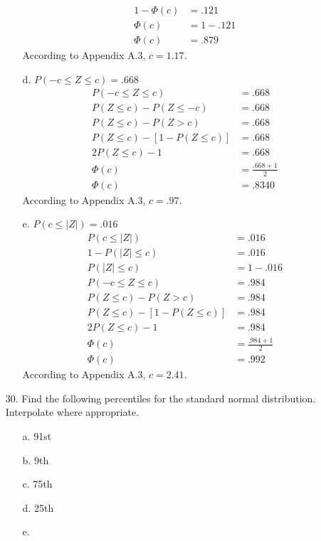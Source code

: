 \documentclass[letterpaper,12pt]{article}
\begin{document}
\begin{enumerate}
\begin{enumerate}
\begin{align*}
          1 - \Phi(c) &= .121 \\
          \Phi(c) &= 1 - .121 \\
          \Phi(c) &= .879
        \end{align*}
        According to Appendix A.3, $c = 1.17$.
      \item[d.]
        $P(-c \le Z \le c) = .668$
        \begin{align*}
          P(-c \le Z \le c) &= .668 \\
          P(Z \le c) - P(Z \le -c) &= .668 \\
          P(Z \le c) - P(Z > c) &= .668 \\
          P(Z \le c) - [1 - P(Z \le c)] &= .668 \\
          2P(Z \le c) - 1 &= .668 \\
          \Phi(c) &= \frac{.668 + 1}{2} \\
          \Phi(c) &= .8340
        \end{align*}
        According to Appendix A.3, $c = .97$.
      \item[e.]
        $P(c \le |Z|) = .016$
        \begin{align*}
          P(c \le |Z|) &= .016 \\
          1 - P(|Z| \le c) &= .016 \\
          P(|Z| \le c) &= 1 - .016 \\
          P(-c \le Z \le c) &= .984 \\
          P(Z \le c) - P(Z > c) &= .984 \\
          P(Z \le c) - [1 - P(Z \le c)] &= .984 \\
          2P(Z \le c) - 1 &= .984 \\
          \Phi(c) &= \frac{.984 + 1}{2} \\
          \Phi(c) &= .992
        \end{align*}
        According to Appendix A.3, $c = 2.41$.
    \end{enumerate}
  \item[30.]
    Find the following percentiles for the standard normal distribution. Interpolate where appropriate.
    \begin{enumerate}
      \item[a.]
        91st
      \item[b.]
        9th
      \item[c.]
        75th
      \item[d.]
        25th
      \item[e.]

\end{enumerate}
\end{enumerate}
\end{document}
